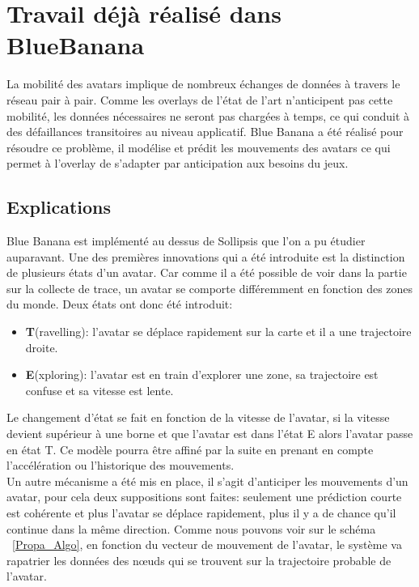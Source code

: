 \section{Travail déjà réalisé dans BlueBanana}
	\label{BlueBanana}
	La mobilité des avatars implique de nombreux échanges de données à travers le réseau pair à pair. Comme les overlays de l'état de l'art n'anticipent pas cette mobilité, les données nécessaires ne seront pas chargées à temps, ce qui conduit à des défaillances transitoires au niveau applicatif. Blue Banana a été réalisé pour résoudre ce problème, il modélise et prédit les mouvements des avatars ce qui permet à l'overlay de s'adapter par anticipation aux besoins du jeux.
	\subsection{Explications}
	Blue Banana est implémenté au dessus de Sollipsis que l'on a pu étudier auparavant. Une des premières innovations qui a été introduite est la distinction de plusieurs états d'un avatar. Car comme il a été possible de voir dans la partie sur la collecte de trace, un avatar se comporte différemment en fonction des zones du monde. Deux états ont donc été introduit:
	\begin{itemize}
		\item \textbf{T}(ravelling): l'avatar se déplace rapidement sur la carte et il a une trajectoire droite.  
		\item \textbf{E}(xploring): l'avatar est en train d'explorer une zone, sa trajectoire est confuse et sa vitesse est lente.
	\end{itemize} 
	Le changement d'état se fait en fonction de la vitesse de l'avatar, si la vitesse devient supérieur à une borne et que l'avatar est dans l'état E alors l'avatar passe en état T. Ce modèle pourra être affiné par la suite en prenant en compte l'accélération ou l'historique des mouvements. \\
	Un autre mécanisme a été mis en place, il s'agit d'anticiper les mouvements d'un avatar, pour cela deux suppositions sont faites: seulement une prédiction courte est cohérente et plus l'avatar se déplace rapidement, plus il y a de chance qu'il continue dans la même direction. Comme nous pouvons voir sur le schéma ~\ref{Propa_Algo}, en fonction du vecteur de mouvement de l'avatar, le système va rapatrier les données des nœuds qui se trouvent sur la trajectoire probable de l'avatar. 	
	 \vspace{1cm}

